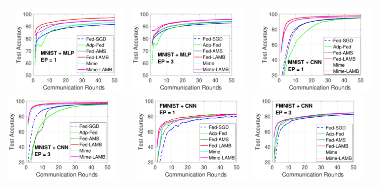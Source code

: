 \documentclass[nohyperref]{article}
\theoremstyle{plain}
\theoremstyle{definition}
\theoremstyle{remark}
\begin{document}
\begin{figure}[t]

    \begin{center}
        \mbox{
        \hspace{-0.1in}\includegraphics[width=0.26\textwidth]{figure_mime/mnist_testerror_mlp_ep1_iid1_mime.pdf}
        \hspace{-0.1in}\includegraphics[width=0.26\textwidth]{figure_mime/mnist_testerror_mlp_ep3_iid1_mime.pdf}
                }
        \mbox{
        \hspace{-0.1in}\includegraphics[width=0.26\textwidth]{figure_mime/mnist_testerror_cnn_ep1_iid1_mime.pdf}
        \hspace{-0.1in}\includegraphics[width=0.26\textwidth]{figure_mime/mnist_testerror_cnn_ep3_iid1_mime.pdf}
                }
        \mbox{
        \hspace{-0.1in}\includegraphics[width=0.26\textwidth]{figure_mime/fmnist_testerror_cnn_ep1_iid1_mime.pdf}
        \hspace{-0.1in}\includegraphics[width=0.26\textwidth]{figure_mime/fmnist_testerror_cnn_ep3_iid1_mime.pdf}
}
\end{center}
\end{figure}
\end{document}
